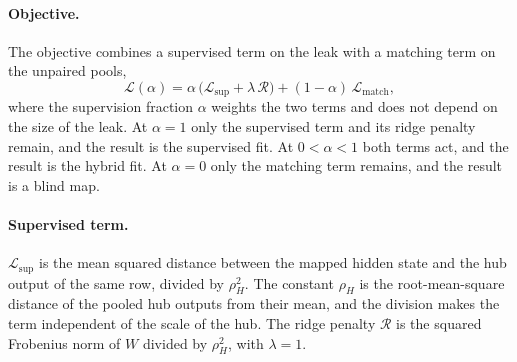 \paragraph{Objective.} The objective combines a supervised term on the leak with a matching term on the unpaired pools,
\begin{equation}
\mathcal{L}(\alpha) = \alpha\,\big(\mathcal{L}_{\text{sup}} + \lambda\,\mathcal{R}\big) + (1-\alpha)\,\mathcal{L}_{\text{match}} ,
\label{eq:attack:loss}
\end{equation}
where the supervision fraction $\alpha$ weights the two terms and does not depend on the size of the leak. %
At $\alpha = 1$ only the supervised term and its ridge penalty remain, and the result is the supervised fit.
At $0 < \alpha < 1$ both terms act, and the result is the hybrid fit.
At $\alpha = 0$ only the matching term remains, and the result is a blind map.

\paragraph{Supervised term.} $\mathcal{L}_{\text{sup}}$ is the mean squared distance between the mapped hidden state and the hub output of the same row, divided by $\rho_H^2$.
The constant $\rho_H$ is the root-mean-square distance of the pooled hub outputs from their mean, and the division makes the term independent of the scale of the hub. %
The ridge penalty $\mathcal{R}$ is the squared Frobenius norm of $W$ divided by $\rho_H^2$, with $\lambda = 1$. %

